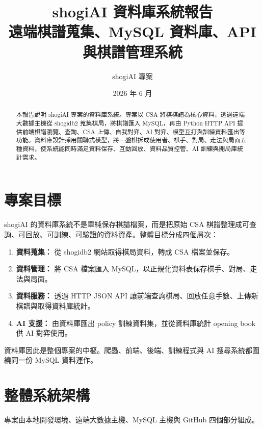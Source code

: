 \documentclass[12pt,a4paper,fontset=none]{ctexart}
\title{\textbf{shogiAI 資料庫系統報告}\\
\large 遠端棋譜蒐集、MySQL 資料庫、API 與棋譜管理系統}
\author{shogiAI 專案}
\date{2026 年 6 月}
\begin{document}
\maketitle

\begin{abstract}
本報告說明 shogiAI 專案的資料庫系統。專案以 CSA 將棋棋譜為核心資料，透過遠端大數據主機從 shogidb2 蒐集棋局，將棋譜匯入 MySQL，再由 Python HTTP API 提供前端棋譜瀏覽、查詢、CSA 上傳、自我對弈、AI 對弈、模型互打與訓練資料匯出等功能。資料庫設計採用關聯式模型，將一盤棋拆成使用者、棋手、對局、走法與局面五種資料，使系統能同時滿足資料保存、互動回放、資料品質控管、AI 訓練與開局庫統計需求。
\end{abstract}

\tableofcontents
\newpage

\section{專案目標}

shogiAI 的資料庫系統不是單純保存棋譜檔案，而是把原始 CSA 棋譜整理成可查詢、可回放、可訓練、可驗證的資料資產。整體目標分成四個層次：

\begin{enumerate}
  \item \textbf{資料蒐集：} 從 shogidb2 網站取得棋局資料，轉成 CSA 檔案並保存。
  \item \textbf{資料管理：} 將 CSA 檔案匯入 MySQL，以正規化資料表保存棋手、對局、走法與局面。
  \item \textbf{資料服務：} 透過 HTTP JSON API 讓前端查詢棋局、回放任意手數、上傳新棋譜與取得資料庫統計。
  \item \textbf{AI 支援：} 由資料庫匯出 policy 訓練資料集，並從資料庫統計 opening book 供 AI 對弈使用。
\end{enumerate}

資料庫因此是整個專案的中樞。爬蟲、前端、後端、訓練程式與 AI 搜尋系統都圍繞同一份 MySQL 資料運作。

\section{整體系統架構}

專案由本地開發環境、遠端大數據主機、MySQL 主機與 GitHub 四個部分組成。
\end{document}
